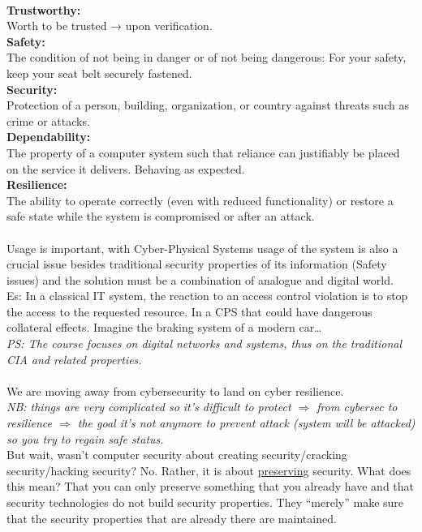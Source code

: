 \\\textbf{Trustworthy:}
\\Worth to be trusted → upon verification.
\\\textbf{Safety:}
\\The condition of not being in danger or of not being dangerous: For your safety, keep your seat belt securely fastened.
\\\textbf{Security:}
\\Protection of a person, building, organization, or country against
threats such as crime or attacks.
\\\textbf{Dependability:}
\\The property of a computer system such that reliance can justifiably be placed on the service it delivers. Behaving as expected.
\\\textbf{Resilience:}
\\The ability to operate correctly (even with reduced functionality) or restore a safe state while the system is compromised or after an attack.
\\\\Usage is important, with Cyber-Physical Systems usage of the system is also a crucial issue besides traditional security properties of its information (Safety issues) and the solution must be a combination of analogue and digital world.
\\  \indent Es: In a classical IT system, the reaction to an access control violation is to stop \indent the access to the requested resource. In a CPS that could have dangerous collateral \indent effects. Imagine the braking system of a modern car…
\\\textit{PS: The course focuses on digital networks and systems, thus on the traditional CIA and related properties.}
\\\\We are moving away from cybersecurity to land on cyber resilience.
\\\textit{NB: things are very complicated so it’s difficult to protect $\Rightarrow$ from cybersec to resilience $\Rightarrow$ the goal it’s not anymore to prevent attack (system will be attacked) so you try to regain safe status.} 
\\But wait, wasn’t computer security about creating security/cracking security/hacking security? No. Rather, it is about \underline{preserving} security.
What does this mean? That you can only preserve something that you already have and that security technologies do not build security properties. They “merely” make sure that the security properties that are already there are maintained.
